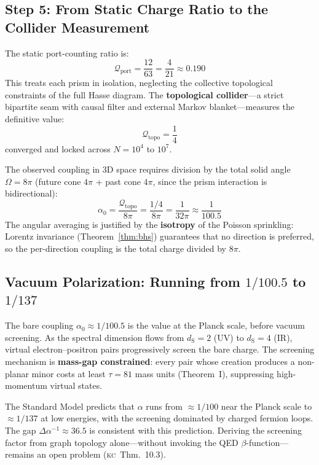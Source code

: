 \documentclass[11pt, a4paper, openany]{book}
\newcommand{\dS}{d_{\mathrm{S}}}
\newcommand{\KC}[1]{\textnormal{(\textsc{kc}~#1)}}
\newcounter{thm}[chapter]
\begin{document}
\subsection{Step 5: From Static Charge Ratio to the Collider Measurement}

The static port-counting ratio is:
\begin{equation}\label{eq:qtopo-port}
    \mathcal{Q}_{\mathrm{port}}
    = \frac{12}{63}
    = \frac{4}{21}
    \approx 0.190
\end{equation}
This treats each prism in isolation, neglecting the collective
topological constraints of the full Hasse diagram. The
\textbf{topological collider}---a strict bipartite seam with causal
filter and external Markov blanket---measures the definitive value:
\begin{equation}\label{eq:qtopo-collider}
  \boxed{
    \mathcal{Q}_{\mathrm{topo}} = \frac{1}{4}
  }
\end{equation}
converged and locked across $N = 10^4$ to $10^7$.

The observed coupling in 3D space requires division by the total solid
angle $\Omega = 8\pi$ (future cone $4\pi$ + past cone $4\pi$, since the
prism interaction is bidirectional):
\begin{equation}\label{eq:alpha0-collider}
  \boxed{
    \alpha_0 = \frac{\mathcal{Q}_{\mathrm{topo}}}{8\pi}
    = \frac{1/4}{8\pi}
    = \frac{1}{32\pi}
    \approx \frac{1}{100.5}
  }
\end{equation}
The angular averaging is justified by the \textbf{isotropy} of the
Poisson sprinkling: Lorentz invariance (Theorem~\ref{thm:bhs})
guarantees that no direction is preferred, so the per-direction
coupling is the total charge divided by $8\pi$.

\subsection{Vacuum Polarization: Running from $1/100.5$ to $1/137$}

The bare coupling $\alpha_0 \approx 1/100.5$ is the value at the Planck
scale, before vacuum screening. As the spectral dimension flows from
$\dS = 2$ (UV) to $\dS = 4$ (IR), virtual electron--positron pairs
progressively screen the bare charge. The screening mechanism is
\textbf{mass-gap constrained}: every pair whose creation produces a
non-planar minor costs at least $\tau = 81$ mass units (Theorem~I),
suppressing high-momentum virtual states.

The Standard Model predicts that $\alpha$ runs from $\approx 1/100$
near the Planck scale to $\approx 1/137$ at low energies, with the
screening dominated by charged fermion loops. The gap
$\Delta\alpha^{-1} \approx 36.5$ is consistent with this prediction.
Deriving the screening factor from graph topology alone---without
invoking the QED $\beta$-function---remains an open problem
\KC{Thm.~10.3}.
\end{document}
